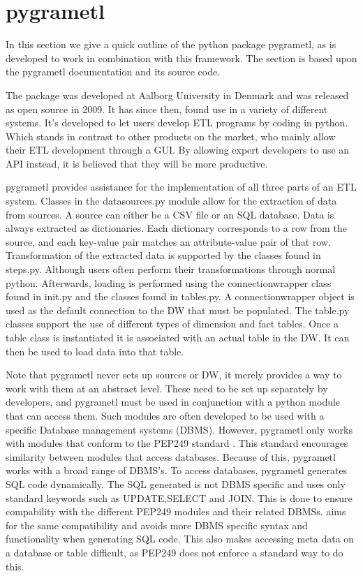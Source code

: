 \section{pygrametl}\label{sect:pygrametl}
In this section we give a quick outline of the python package pygrametl, as \FW{} is developed to work in combination with this framework. The section is based upon the pygrametl documentation and its source code\cite{pygramSource}.

The package was developed at Aalborg University in Denmark and was released as open source in 2009. It has since then, found use in a variety of different systems. It's developed to let users develop ETL programs by coding in python. Which stands in contrast to other products on the market, who mainly allow their ETL development through a GUI. By allowing expert developers to use an API instead, it is believed that they will be more productive.

pygrametl provides assistance for the implementation of all three parts of an ETL system. Classes in the datasources.py module allow for the extraction of data from sources. A source can either be a CSV file or an SQL database. Data is always extracted as dictionaries. Each dictionary corresponds to a row from the source, and each key-value pair matches an attribute-value pair of that row. Transformation of the extracted data is supported by the classes found in steps.py. Although users often perform their transformations through normal python. Afterwards, loading is performed using the connectionwrapper class found in init.py and the classes found in tables.py. A connectionwrapper object is used as the default connection to the DW that must be populated. The table.py classes support the use of different types of dimension and fact tables. Once a table class is instantiated it is associated with an actual table in the DW. It can then be used to load data into that table.

Note that pygrametl never sets up sources or DW, it merely provides a way to work with them at an abstract level. These need to be set up separately by developers, and pygrametl must be used in conjunction with a python module that can access them. Such modules are often developed to be used with a specific Database management systems (DBMS). However, pygrametl only works with modules that conform to the PEP249 standard \cite{pep249}. This standard encourages similarity between modules that access databases. Because of this, pygrametl works with a broad range of DBMS's. To access databases, pygrametl generates SQL code dynamically. The SQL generated is not DBMS specific and uses only standard keywords such as UPDATE,SELECT and JOIN. This is done to ensure compability with the different PEP249 modules and their related DBMSs. \FW{} aims for the same compatibility and avoids more DBMS specific syntax and functionality when generating SQL code. This also makes accessing meta data on a database or table difficult, as PEP249 does not enforce a standard way to do this.